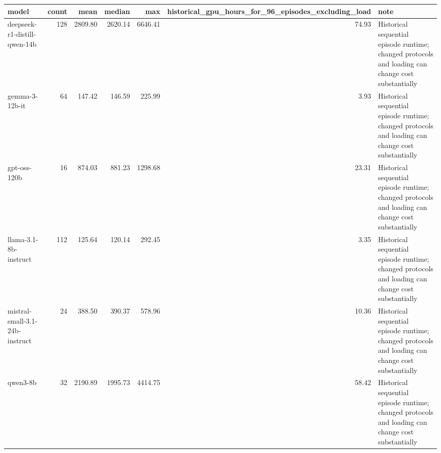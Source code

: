 \begin{tabular}{lrrrrrl}
\toprule
model & count & mean & median & max & historical\_gpu\_hours\_for\_96\_episodes\_excluding\_load & note \\
\midrule
deepseek-r1-distill-qwen-14b & 128 & 2809.80 & 2620.14 & 6646.41 & 74.93 & Historical sequential episode runtime; changed protocols and loading can change cost substantially \\
gemma-3-12b-it & 64 & 147.42 & 146.59 & 225.99 & 3.93 & Historical sequential episode runtime; changed protocols and loading can change cost substantially \\
gpt-oss-120b & 16 & 874.03 & 881.23 & 1298.68 & 23.31 & Historical sequential episode runtime; changed protocols and loading can change cost substantially \\
llama-3.1-8b-instruct & 112 & 125.64 & 120.14 & 292.45 & 3.35 & Historical sequential episode runtime; changed protocols and loading can change cost substantially \\
mistral-small-3.1-24b-instruct & 24 & 388.50 & 390.37 & 578.96 & 10.36 & Historical sequential episode runtime; changed protocols and loading can change cost substantially \\
qwen3-8b & 32 & 2190.89 & 1995.73 & 4414.75 & 58.42 & Historical sequential episode runtime; changed protocols and loading can change cost substantially \\
\bottomrule
\end{tabular}
